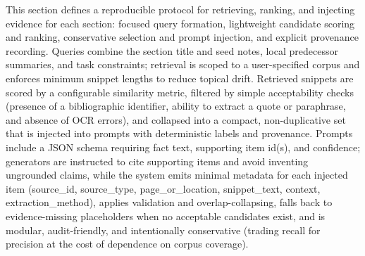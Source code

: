 This section defines a reproducible protocol for retrieving, ranking, and injecting evidence for each section: focused query formation, lightweight candidate scoring and ranking, conservative selection and prompt injection, and explicit provenance recording. Queries combine the section title and seed notes, local predecessor summaries, and task constraints; retrieval is scoped to a user-specified corpus and enforces minimum snippet lengths to reduce topical drift. Retrieved snippets are scored by a configurable similarity metric, filtered by simple acceptability checks (presence of a bibliographic identifier, ability to extract a quote or paraphrase, and absence of OCR errors), and collapsed into a compact, non-duplicative set that is injected into prompts with deterministic labels and provenance. Prompts include a JSON schema requiring fact text, supporting item id(s), and confidence; generators are instructed to cite supporting items and avoid inventing ungrounded claims, while the system emits minimal metadata for each injected item (source_id, source_type, page_or_location, snippet_text, context, extraction_method), applies validation and overlap-collapsing, falls back to evidence-missing placeholders when no acceptable candidates exist, and is modular, audit-friendly, and intentionally conservative (trading recall for precision at the cost of dependence on corpus coverage).